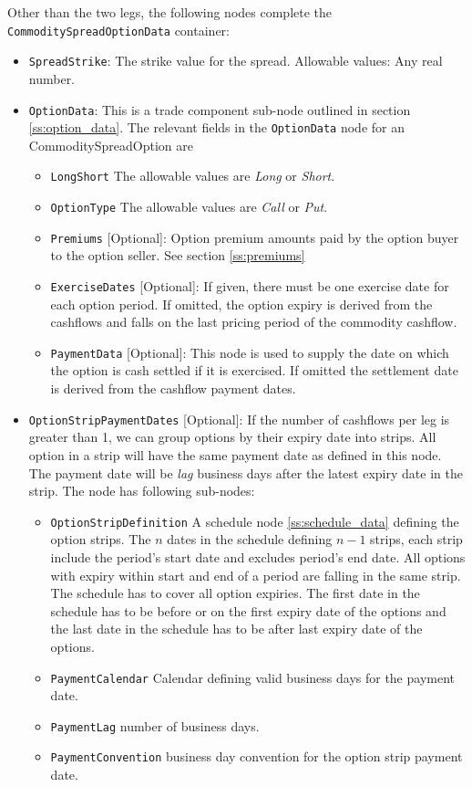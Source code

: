 Other than the two legs, the following nodes complete the \lstinline!CommoditySpreadOptionData! container:
\begin{itemize}
    \item \lstinline!SpreadStrike!: The strike value for the spread. Allowable values: Any real number.
    \item \lstinline!OptionData!: This is a trade component sub-node outlined in section \ref{ss:option_data}. 
The relevant fields in the \lstinline!OptionData! node for an CommoditySpreadOption are
	\begin{itemize}
		\item \lstinline!LongShort! The allowable values are \emph{Long} or \emph{Short}.
		\item \lstinline!OptionType! The allowable values are \emph{Call} or \emph{Put}. 
		\item \lstinline!Premiums! [Optional]: Option premium amounts paid by the option buyer to the option seller. See section \ref{ss:premiums}
		\item \lstinline!ExerciseDates! [Optional]: If given, there must be one exercise date for each option period. If omitted, the option expiry is derived from the cashflows and falls on the last pricing period of the commodity cashflow.
		\item \lstinline!PaymentData! [Optional]:  This node is used to supply the date on which the option is cash settled if it is exercised. If omitted the settlement date is derived from the cashflow payment dates.
	\end{itemize}
	\item \lstinline!OptionStripPaymentDates! [Optional]: If the number of cashflows per leg is greater than 1, we can group options by their expiry date into strips. All option in a strip will have the same payment date as defined in this node. The payment date will be \emph{lag} business days after the latest expiry date in the strip. The node has following sub-nodes:
	\begin{itemize}
	\item \lstinline!OptionStripDefinition! A schedule node \ref{ss:schedule_data} defining the option strips. The $n$ dates in the schedule defining $n-1$ strips, each strip include the period's start date and excludes period's end date. All options with expiry within start and end of a period are falling in the same strip. The schedule has to cover all option expiries. The first date in the schedule has to be before or on the first expiry date of the options and the last date in the schedule has to be after last expiry date of the options. 
	\item \lstinline!PaymentCalendar! Calendar defining valid business days for the payment date.
	\item \lstinline!PaymentLag! number of business days.
	\item \lstinline!PaymentConvention! business day convention for the option strip payment date.
	\end{itemize}
\end{itemize}

